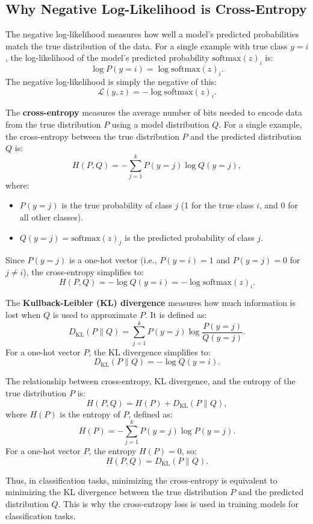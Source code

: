 \begin{notechapter}
\subsection{Why Negative Log-Likelihood is Cross-Entropy}
The negative log-likelihood measures how well a model's predicted probabilities match the true distribution of the data. For a single example with true class \( y = i \), the log-likelihood of the model's predicted probability \( \text{softmax}(z)_i \) is:
\[
\log P(y = i) = \log \text{softmax}(z)_i.
\]
The negative log-likelihood is simply the negative of this:
\[
\mathcal{L}(y, z) = -\log \text{softmax}(z)_i.
\]

The \textbf{cross-entropy} measures the average number of bits needed to encode data from the true distribution \( P \) using a model distribution \( Q \). For a single example, the cross-entropy between the true distribution \( P \) and the predicted distribution \( Q \) is:
\[
H(P, Q) = -\sum_{j=1}^k P(y = j) \log Q(y = j),
\]
where:
\begin{itemize}
    \item \( P(y = j) \) is the true probability of class \( j \) (1 for the true class \( i \), and 0 for all other classes).
    \item \( Q(y = j) = \text{softmax}(z)_j \) is the predicted probability of class \( j \).
\end{itemize}

Since \( P(y = j) \) is a one-hot vector (i.e., \( P(y = i) = 1 \) and \( P(y = j) = 0 \) for \( j \neq i \)), the cross-entropy simplifies to:
\[
H(P, Q) = -\log Q(y = i) = -\log \text{softmax}(z)_i.
\]

The \textbf{Kullback-Leibler (KL) divergence} measures how much information is lost when \( Q \) is used to approximate \( P \). It is defined as:
\[
D_{\text{KL}}(P \parallel Q) = \sum_{j=1}^k P(y = j) \log \frac{P(y = j)}{Q(y = j)}.
\]
For a one-hot vector \( P \), the KL divergence simplifies to:
\[
D_{\text{KL}}(P \parallel Q) = -\log Q(y = i).
\]

The relationship between cross-entropy, KL divergence, and the entropy of the true distribution \( P \) is:
\[
H(P, Q) = H(P) + D_{\text{KL}}(P \parallel Q),
\]
where \( H(P) \) is the entropy of \( P \), defined as:
\[
H(P) = -\sum_{j=1}^k P(y = j) \log P(y = j).
\]
For a one-hot vector \( P \), the entropy \( H(P) = 0 \), so:
\[
H(P, Q) = D_{\text{KL}}(P \parallel Q).
\]

Thus, in classification tasks, minimizing the cross-entropy is equivalent to minimizing the KL divergence between the true distribution \( P \) and the predicted distribution \( Q \). This is why the cross-entropy loss is used in training models for classification tasks.


\end{notechapter}
